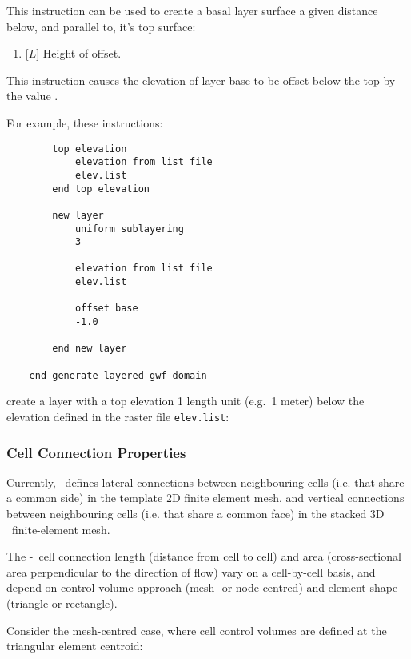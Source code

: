 {This instruction can be used to create a basal layer surface a given distance below, and parallel to, it's top surface:

    {\squish
    \begin{enumerate}
        \item {} [$L$] Height of offset.
    \end{enumerate}
    This instruction causes the elevation of layer base to be offset below the  top by the  value .
}

\pagebreak
For example, these instructions:
\begin{verbatim}
        top elevation
            elevation from list file
            elev.list
        end top elevation

        new layer
            uniform sublayering
            3

            elevation from list file
            elev.list

            offset base
            -1.0

        end new layer

    end generate layered gwf domain
\end{verbatim}
 create a layer with a top elevation 1 length unit (e.g.\ 1 meter) below the elevation defined in the raster file \texttt{elev.list}:


\subsubsection{Cell Connection Properties}
\label{section:GWFCellConnections}

Currently, \mut\ defines lateral connections between neighbouring cells (i.e. that share a common side) in the template 2D finite element mesh, and vertical connections between neighbouring cells (i.e. that share a common face) in the stacked 3D \gwf\ finite-element mesh.

The \gwf-\gwf\ cell connection length (distance from cell to cell) and area (cross-sectional area perpendicular to the direction of flow) vary on a cell-by-cell basis, and depend on control volume approach (mesh- or node-centred) and element shape (triangle or rectangle).

Consider the mesh-centred case, where cell control volumes are defined at the triangular element centroid:

}
